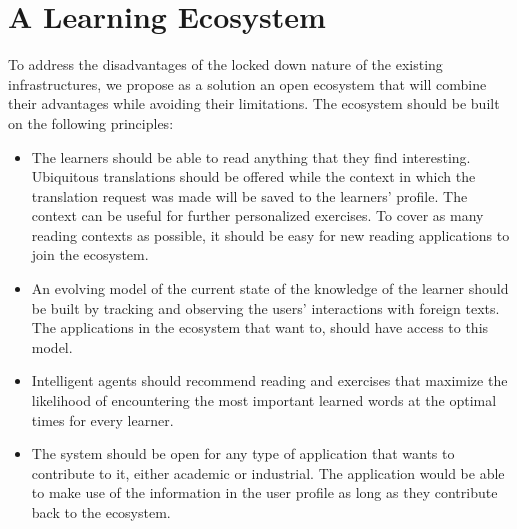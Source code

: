 

\section {A Learning Ecosystem}

To address the disadvantages of the locked down nature of the existing infrastructures, we propose as a solution an open ecosystem that will combine their advantages while avoiding their limitations. The ecosystem should be built on the following principles:

\begin{itemize}

	\item The learners should be able to read anything that they find interesting. Ubiquitous translations should be offered while the context in which the translation request was made will be saved to the learners' profile. The context can be useful for further personalized exercises. To cover as many reading contexts as possible, it should be easy for new reading applications to join the ecosystem.

	\item An evolving model of the current state of the knowledge of the learner should be built by tracking and observing the users' interactions with foreign texts. The applications in the ecosystem that want to, should have access to this model.

	\item Intelligent agents should recommend reading and exercises that maximize the likelihood of encountering the most important learned words at the optimal times for every learner.

	\item The system should be open for any type of application that wants to contribute to it, either academic or industrial. The application would be able to make use of the information in the user profile as long as they contribute back to the ecosystem. 

\end{itemize}

